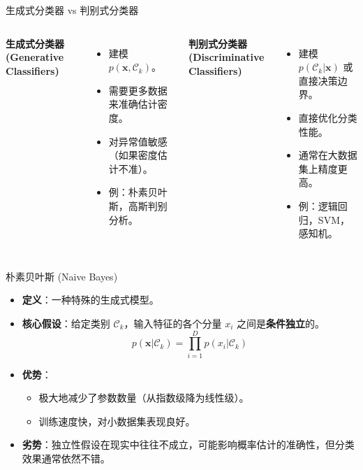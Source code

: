 \documentclass[12pt, aspectratio=169]{beamer}
\newcommand{\vect}[1]{\mathbf{#1}}
\begin{document}
\begin{frame}{生成式分类器 vs 判别式分类器}
    \begin{columns}
        \textbf{生成式分类器 (Generative Classifiers)}
        \begin{itemize}
            \item 建模 $p(\vect{x}, \mathcal{C}_k)$。
            \item 需要更多数据来准确估计密度。
            \item 对异常值敏感（如果密度估计不准）。
            \item 例：朴素贝叶斯，高斯判别分析。
        \end{itemize}
        
        \textbf{判别式分类器 (Discriminative Classifiers)}
        \begin{itemize}
            \item 建模 $p(\mathcal{C}_k|\vect{x})$ 或直接决策边界。
            \item 直接优化分类性能。
            \item 通常在大数据集上精度更高。
            \item 例：逻辑回归，SVM，感知机。
        \end{itemize}
    \end{columns}
\end{frame}

\begin{frame}{朴素贝叶斯 (Naive Bayes)}
    \begin{itemize}
        \item \textbf{定义}：一种特殊的生成式模型。
        \item \textbf{核心假设}：给定类别 $\mathcal{C}_k$，输入特征的各个分量 $x_i$ 之间是\textbf{条件独立}的。
        $$ p(\vect{x}|\mathcal{C}_k) = \prod_{i=1}^D p(x_i|\mathcal{C}_k) $$
        \item \textbf{优势}：
        \begin{itemize}
            \item 极大地减少了参数数量（从指数级降为线性级）。
            \item 训练速度快，对小数据集表现良好。
        \end{itemize}
        \item \textbf{劣势}：独立性假设在现实中往往不成立，可能影响概率估计的准确性，但分类效果通常依然不错。
    \end{itemize}
\end{frame}
\end{document}
